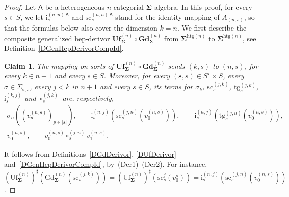 \documentclass[a4paper, reqno]{amsbook}
\newcommand{\bb}[1]{\ensuremath{\lvert #1 \rvert}}
\newcommand{\sig}[1]{\mathbf{#1}}             %
\newcommand{\calg}[1]{\boldsymbol{\mathsf{#1}}} %
\newcommand{\htg}{\mathrm{htg}}                %
\newcommand{\src}{\mathrm{sc}}
\newcommand{\tgt}{\mathrm{tg}}
\newcommand{\Gd}{\mathrm{Gd}}
\newcommand{\Uf}{\mathrm{Uf}}
\newcommand{\bGd}{\mathbf{Gd}}
\newcommand{\bUf}{\mathbf{Uf}}
\theoremstyle{plain}
\newtheorem{claim}[theorem]{Claim}
\theoremstyle{definition}
\begin{document}
\begin{proof}
Let $\calg{A}$ be a heterogeneous $n$-categorial $\sig{\Sigma}$-algebra.
In this proof, for every $s\in S$, we let $\mathrm{i}^{(n,n)\,\calg{A}}_{s}$ and $\src^{(n,n)\,\calg{A}}_{s}$ stand for the identity mapping of $A_{(n,s)}$, so that the formulas below also cover the dimension $k=n$.
We first describe the composite generalized hep-derivor $\bUf^{(n)}_{\sig{\Sigma}}\circ\bGd^{(n)}_{\sig{\Sigma}}$ from $\sig{\Sigma}^{\htg(n)}$ to $\sig{\Sigma}^{\htg(n)}$, see Definition~\ref{DGenHepDerivorCompId}.

\begin{claim}\label{ClGdUfIsoA}
The mapping on sorts of $\bUf^{(n)}_{\sig{\Sigma}}\circ\bGd^{(n)}_{\sig{\Sigma}}$ sends $(k,s)$ to $(n,s)$, for every $k\in n+1$ and every $s\in S$.
Moreover, for every $(\mathbf{s},s)\in S^{\star}\times S$, every $\sigma\in\Sigma_{\mathbf{s},s}$, every $j<k$ in $n+1$ and every $s\in S$, its terms for $\sigma_k$, $\src^{(j,k)}_s$, $\tgt^{(j,k)}_s$, $\mathrm{i}^{(k,j)}_s$ and $\circ^{(j,k)}_s$ are, respectively,
\begin{gather*}
\sigma_n\left((v^{(n,\mathbf{s})}_p)_{p\in\bb{\mathbf{s}}}\right),\qquad
\mathrm{i}^{(n,j)}_s\left(\src^{(j,n)}_s(v^{(n,s)}_{0})\right),\qquad
\mathrm{i}^{(n,j)}_s\left(\tgt^{(j,n)}_s(v^{(n,s)}_{0})\right),\\
v^{(n,s)}_{0},\qquad v^{(n,s)}_{0}\circ^{(j,n)}_s v^{(n,s)}_{1}.
\end{gather*}
\end{claim}
It follows from Definitions~\ref{DGdDerivor}, \ref{DUfDerivor} and~\ref{DGenHepDerivorCompId}, by~(Der1)--(Der2).
For instance, $(\Uf^{(n)}_{\sig{\Sigma}})^{\sharp}(\Gd^{(n)}_{\sig{\Sigma}}(\src^{(j,k)}_s))=(\Uf^{(n)}_{\sig{\Sigma}})^{\sharp}(\src^{j}_{s}(v^{s}_{0}))=\mathrm{i}^{(n,j)}_s(\src^{(j,n)}_s(v^{(n,s)}_{0}))$.


\end{proof}
\end{document}
